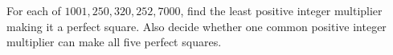 For each of $1001,250,320,252,7000$, find the least positive integer multiplier making it a perfect square. Also decide whether one common positive integer multiplier can make all five perfect squares.
